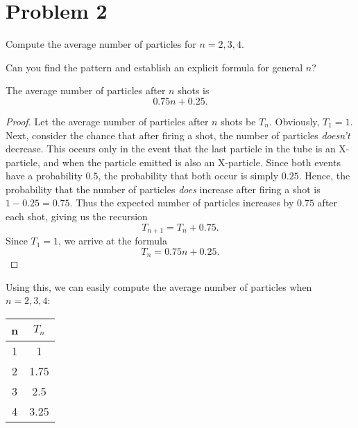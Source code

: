 \section{Problem 2}

Compute the average number of particles for $n = 2, 3, 4$.

Can you find the pattern and establish an explicit formula for general $n$?

\begin{theorem}\label{thm:2}
  The average number of particles after $n$ shots is \[
  0.75n + 0.25
  .\]
\end{theorem}
\begin{proof}
  Let the average number of particles after $n$ shots be $T_n$. Obviously, $T_1 = 1$. Next, consider the chance that after firing a shot, the number of particles \emph{doesn't} decrease. This occurs only in the event that the last particle in the tube is an X-particle, and when the particle emitted is also an X-particle. Since both events have a probability $0.5$, the probability that both occur is simply $0.25$. Hence, the probability that the number of particles \emph{does} increase after firing a shot is $1 - 0.25 = 0.75$. Thus the expected number of particles increases by $0.75$ after each shot, giving us the recursion \[
    T_{n+1} = T_{n} + 0.75
  .\] Since $T_1 = 1$, we arrive at the formula \[
    T_{n} = 0.75n + 0.25 \tag*{\qedhere}
  .\] 
\end{proof}

Using this, we can easily compute the average number of particles when $n = 2, 3, 4$:
\begin{table}[H]
  \centering
  \begin{tabular}{cc}
    \toprule
    n & $T_n$ \\
    \midrule
    1 & 1 \\
    2 & 1.75 \\
    3 & 2.5 \\
    4 & 3.25 \\
    \bottomrule
  \end{tabular}
\end{table}
